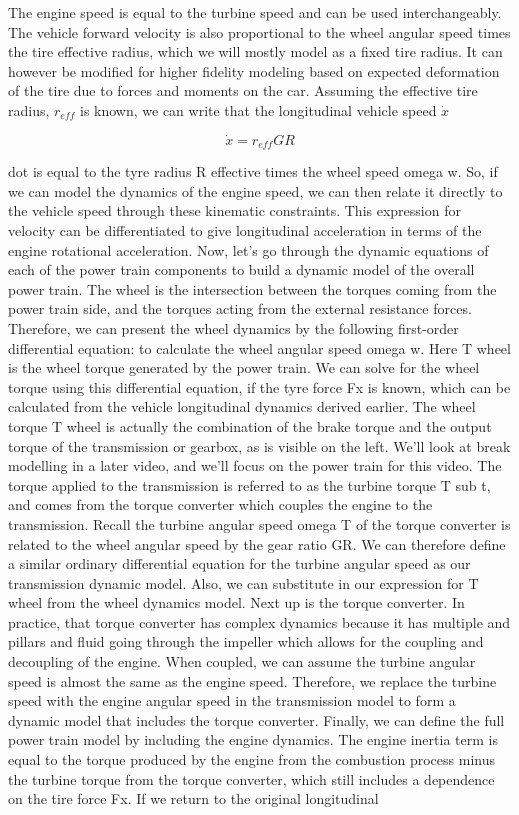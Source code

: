 The engine speed is equal to the turbine speed and can be used interchangeably. The vehicle forward velocity is also proportional to the wheel angular speed times the tire effective radius, which we will mostly model as a fixed tire radius. It can however be modified for higher fidelity modeling based on expected deformation of the tire due to forces and moments on the car. Assuming the effective tire radius, $r_{eff}$ is known, we can write that the longitudinal vehicle speed $\dot{x}$

\begin{equation}
\dot{x} = r_{eff}GR
\end{equation}

 dot is equal to the tyre radius R effective times the wheel speed omega w. So, if we can model the dynamics of the engine speed, we can then relate it directly to the vehicle speed through these kinematic constraints. This expression for velocity can be differentiated to give longitudinal acceleration in terms of the engine rotational acceleration. Now, let's go through the dynamic equations of each of the power train components to build a dynamic model of the overall power train. The wheel is the intersection between the torques coming from the power train side, and the torques acting from the external resistance forces. Therefore, we can present the wheel dynamics by the following first-order differential equation: to calculate the wheel angular speed omega w. Here T wheel is the wheel torque generated by the power train. We can solve for the wheel torque using this differential equation, if the tyre force Fx is known, which can be calculated from the vehicle longitudinal dynamics derived earlier. The wheel torque T wheel is actually the combination of the brake torque and the output torque of the transmission or gearbox, as is visible on the left. We'll look at break modelling in a later video, and we'll focus on the power train for this video. The torque applied to the transmission is referred to as the turbine torque T sub t, and comes from the torque converter which couples the engine to the transmission. Recall the turbine angular speed omega T of the torque converter is related to the wheel angular speed by the gear ratio GR. We can therefore define a similar ordinary differential equation for the turbine angular speed as our transmission dynamic model. Also, we can substitute in our expression for T wheel from the wheel dynamics model. Next up is the torque converter. In practice, that torque converter has complex dynamics because it has multiple and pillars and fluid going through the impeller which allows for the coupling and decoupling of the engine. When coupled, we can assume the turbine angular speed is almost the same as the engine speed. Therefore, we replace the turbine speed with the engine angular speed in the transmission model to form a dynamic model that includes the torque converter. Finally, we can define the full power train model by including the engine dynamics. The engine inertia term is equal to the torque produced by the engine from the combustion process minus the turbine torque from the torque converter, which still includes a dependence on the tire force Fx. If we return to the original longitudinal 
